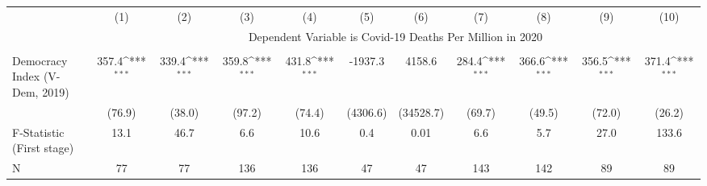 {
\def\sym#1{\ifmmode^{#1}\else\(^{#1}\)\fi}
\begin{tabular}{l*{10}{c}}
\hline\hline
                    &\multicolumn{1}{c}{(1)}         &\multicolumn{1}{c}{(2)}         &\multicolumn{1}{c}{(3)}         &\multicolumn{1}{c}{(4)}         &\multicolumn{1}{c}{(5)}         &\multicolumn{1}{c}{(6)}         &\multicolumn{1}{c}{(7)}         &\multicolumn{1}{c}{(8)}         &\multicolumn{1}{c}{(9)}         &\multicolumn{1}{c}{(10)}         \\
&\multicolumn{10}{c}{ Dependent Variable is Covid-19 Deaths Per Million in 2020}\\\cline{2-11}\\[-1.8ex]
Democracy Index (V-Dem, 2019)&       357.4\sym{***}&       339.4\sym{***}&       359.8\sym{***}&       431.8\sym{***}&     -1937.3         &      4158.6         &       284.4\sym{***}&       366.6\sym{***}&       356.5\sym{***}&       371.4\sym{***}\\
                    &      (76.9)         &      (38.0)         &      (97.2)         &      (74.4)         &    (4306.6)         &   (34528.7)         &      (69.7)         &      (49.5)         &      (72.0)         &      (26.2)         \\
\hline
F-Statistic (First stage)&        13.1         &        46.7         &         6.6         &        10.6         &         0.4         &        0.01         &         6.6         &         5.7         &        27.0         &       133.6         \\
N                   &          77         &          77         &         136         &         136         &          47         &          47         &         143         &         142         &          89         &          89         \\
\hline\hline
\end{tabular}
}
